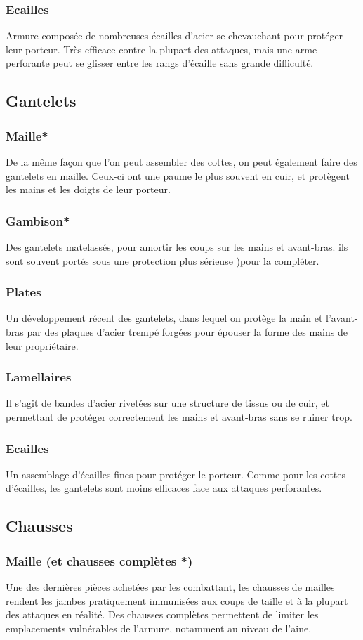\documentclass[10pt,a4paper,twocolumn]{book}
\begin{document}
\subsubsection{Ecailles}
Armure composée de nombreuses écailles d'acier se chevauchant pour protéger leur porteur. Très efficace contre la plupart des attaques, mais une arme perforante peut se glisser entre les rangs d'écaille sans grande difficulté.
\subsection{Gantelets}
\subsubsection{Maille*}
De la même façon que l'on peut assembler des cottes, on peut également faire des gantelets en maille. Ceux-ci ont une paume le plus souvent en cuir, et protègent les mains et les doigts de leur porteur.
\subsubsection{Gambison*}
Des gantelets matelassés, pour amortir les coups sur les mains et avant-bras. ils sont souvent portés sous une protection plus sérieuse )pour la compléter.
\subsubsection{Plates}
Un développement récent des gantelets, dans lequel on protège la main et l'avant-bras par des plaques d'acier trempé forgées pour épouser la forme des mains de leur propriétaire.
\subsubsection{Lamellaires}
Il s'agit de bandes d'acier rivetées sur une structure de tissus ou de cuir, et permettant de protéger correctement les mains et avant-bras sans se ruiner trop.
\subsubsection{Ecailles}
Un assemblage d'écailles fines pour protéger le porteur. Comme pour les cottes d'écailles, les gantelets sont moins efficaces face aux attaques perforantes.
\subsection{Chausses}
\subsubsection{Maille (et chausses complètes *)}
Une des dernières pièces achetées par les combattant, les chausses de mailles rendent les jambes pratiquement immunisées aux coups de taille et à la plupart des attaques en réalité. Des chausses complètes permettent de limiter les emplacements vulnérables de l'armure, notamment au niveau de l'aine.
\end{document}
